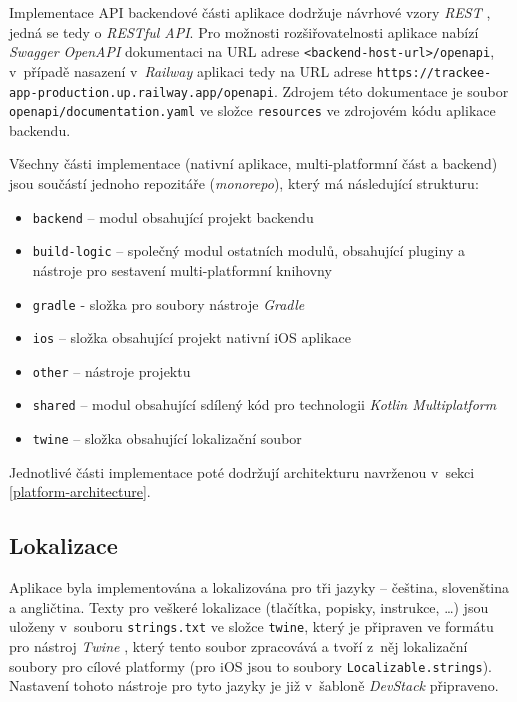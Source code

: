 Implementace API backendové části aplikace dodržuje návrhové vzory \emph{REST} \cite{rest-api}, jedná se tedy o \emph{RESTful API}. Pro možnosti rozšiřovatelnosti aplikace nabízí \emph{Swagger OpenAPI} dokumentaci \cite{swagger-open-api} na URL adrese \texttt{<backend-host-url>/openapi}, v~případě nasazení v~\emph{Railway} aplikaci tedy na URL adrese \texttt{https://trackee-app-production.up.railway.app/openapi}. Zdrojem této dokumentace je soubor \texttt{openapi/documentation.yaml} ve složce \texttt{resources} ve zdrojovém kódu aplikace backendu.

Všechny části implementace (nativní aplikace, multi-platformní část a backend) jsou součástí jednoho repozitáře (\emph{monorepo}), který má následující strukturu:
\begin{itemize}
\item\texttt{backend} – modul obsahující projekt backendu
\item\texttt{build-logic} – společný modul ostatních modulů, obsahující pluginy a nástroje pro sestavení multi-platformní knihovny
\item\texttt{gradle} - složka pro soubory nástroje \emph{Gradle}
\item\texttt{ios} – složka obsahující projekt nativní iOS aplikace
\item\texttt{other} – nástroje projektu
\item\texttt{shared} – modul obsahující sdílený kód pro technologii \emph{Kotlin Multiplatform}
\item\texttt{twine} – složka obsahující lokalizační soubor
\end{itemize}
Jednotlivé části implementace poté dodržují architekturu navrženou v~sekci \ref{platform-architecture}.

\subsection{Lokalizace}

Aplikace byla implementována a lokalizována pro tři jazyky – čeština, slovenština a angličtina. Texty pro veškeré lokalizace (tlačítka, popisky, instrukce, \dots) jsou uloženy v~souboru \texttt{strings.txt} ve složce \texttt{twine}, který je připraven ve formátu pro nástroj \emph{Twine} \cite{twine}, který tento soubor zpracovává a tvoří z~něj lokalizační soubory pro cílové platformy (pro iOS jsou to soubory \texttt{Localizable.strings}). Nastavení tohoto nástroje pro tyto jazyky je již v~šabloně \emph{DevStack} připraveno.

